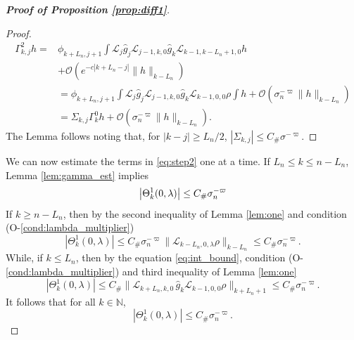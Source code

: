 \documentclass{amsart}
\numberwithin{equation}{section}
\newcommand\cL{{\mathcal L}}
\newcommand\cO{{\mathcal O}}
\newcommand{\Const}{C_{\#}}
\begin{document}
\begin{proof}[\bf \em Proof of Proposition \ref{prop:diff1}]
\begin{proof}
\begin{equation}\label{eq:gamma2}
\begin{split}
\Gamma^2_{k,j}h=&\phi_{k+L_n,j+1}\int \cL_j\hat g_j\cL_{j-1,k,0}\hat g_k\cL_{k-1,k-L_n+1,0}h\\
&+\cO(e^{-c|k+L_n-j|}\|h\|_{k-L_n})\\
&=\phi_{k+L_n,j+1}\int \cL_j\hat g_j\cL_{j-1,k,0}\hat g_k\cL_{k-1,0,0}\rho \int h+\cO(\sigma_n^{-\varpi}\|h\|_{k-L_n})\\
&=\Sigma_{k, j}\Gamma_k^0h+\cO(\sigma_n^{-\varpi}\|h\|_{k-L_n}).
\end{split}
\end{equation}
The Lemma follows noting that, for $|k-j|\geq L_n/2$, $|\Sigma_{k,j}|\leq \Const \sigma^{-\varpi}$.
\end{proof}

We can now estimate the terms in \eqref{eq:step2} one at a time. \newline
If $L_n\leq k\leq n-L_n$, Lemma \eqref{lem:gamma_est} implies
\[
\left|\Theta^1_k(0,\lambda)\right|\leq  \Const \sigma_n^{-\varpi}\\
\]
If $k\geq n-L_n$, then by the second inequality of Lemma \ref{lem:one} and  condition (O-\ref{cond:lambda_multiplier})
\[
\left|\Theta^1_k(0,\lambda)\right|\leq\Const \sigma_n^{-\varpi}\|\cL_{k-L_n,0,\lambda} \rho\|_{k-L_n}\leq \Const \sigma_n^{-\varpi}.
\]
While, if $k\leq L_n$, then by the equation \eqref{eq:int_bound}, condition (O-\ref{cond:lambda_multiplier}) and third inequality of Lemma \ref{lem:one}
\[
\left|\Theta^1_k(0,\lambda)\right|\leq \Const\|\cL_{k+L_n, k,0}\,\hat g_k\cL_{k-1,0,0} \rho\|_{k+L_n+1}\leq \Const \sigma_n^{-\varpi}.
\]
It follows that for all $k \in \mathbb{N}$,
\begin{equation}\label{eq:theta1}
|\Theta^1_k(0,\lambda)|\leq \Const \sigma_n^{-\varpi}.
\end{equation}



\end{proof}
\end{document}
